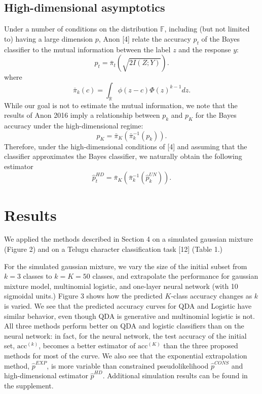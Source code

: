 \documentclass{article}
\begin{document}
\subsection{High-dimensional asymptotics}

Under a number of conditions on the distribution $\mathbb{F}$, including (but not limited to) having a large dimension $p$,
Anon [4] relate the accuracy $p_t$ of the Bayes classifier to the mutual information between the label $z$ and
the response $y$:
\[
p_t = \bar{\pi}_t(\sqrt{2I(Z; Y)}).
\]
where
\[
\bar{\pi}_k(c) = \int_{\mathbb{R}} \phi(z - c)  \Phi(z)^{k-1} dz.
\]
While our goal is not to estimate the mutual information, we note that the results of Anon 2016
imply a relationship between $p_k$ and $p_K$ for the Bayes accuracy under the high-dimensional regime:
\[
p_K = \bar{\pi}_K\left(\bar{\pi}_k^{-1}(p_k)\right).
\]
Therefore, under the high-dimensional conditions of [4] and assuming that the classifier approximates
the Bayes classifier, we naturally obtain the following estimator
\[
\hat{p}_t^{HD} = \bar{\pi}_K\left(\bar{\pi}_k^{-1}(\hat{p}_k^{UN})\right).
\]

\section{Results}

We applied the methods described in Section 4 on a simulated gaussian mixture (Figure 2)
and on a Telugu character classification task [12] (Table 1.)

For the simulated gaussian mixture, we vary the size of the initial subset from $k=3$ classes to $k=K=50$ classes,
and extrapolate the performance for gaussian mixture model, multinomial logistic, and one-layer neural network (with 10 sigmoidal units.)
Figure 3 shows how the predicted $K$-class accuracy changes as $k$ is varied.
We see that the predicted accuracy curves for QDA and Logistic have similar behavior,
even though QDA is generative and multinomial logistic is not.  All three methods perform better on QDA and logistic classifiers
than on the neural network: in fact, for the neural network, the test accuracy of the initial set, $\text{acc}^{(k)}$,
becomes a better estimator of $\text{acc}^{(K)}$ than the three proposed methods for most of the curve.
We also see that the exponential extrapolation method, $\hat{p}^{EXP}$,
is more variable than constrained pseudolikelihood $\hat{p}^{CONS}$ and high-dimensional estimator $\hat{p}^{HD}$.
Additional simulation results can be found in the supplement.
\end{document}
